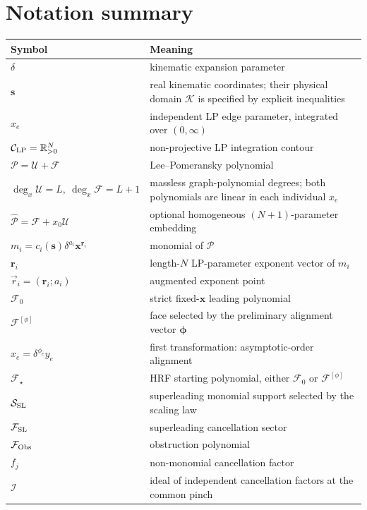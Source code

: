 \documentclass[a4paper,11pt]{article}
\newcommand{\x}{\boldsymbol{x}}
\newcommand{\s}{\boldsymbol{s}}
\newcommand{\K}{\mathcal K}
\newcommand{\FSL}{\mathcal F_{\rm SL}}
\newcommand{\SSL}{\mathcal S_{\rm SL}}
\newcommand{\FObs}{\mathcal F_{\rm Obs}}
\newcommand{\ideal}{\mathcal I}
\begin{document}
\appendix
\section{Notation summary}

\begin{center}
\begin{tabular}{@{}p{}p{}@{}}
\toprule
Symbol & Meaning\\
\midrule
\(\delta\) & kinematic expansion parameter\\
\(\s\) & real kinematic coordinates; their physical domain \(\K\) is specified
  by explicit inequalities\\
\(x_e\) & independent LP edge parameter, integrated over \((0,\infty)\)\\
\(\mathcal C_{\rm LP}=\mathbb R_{>0}^{N}\) & non-projective LP integration
  contour\\
\(\mathcal P=\mathcal U+\mathcal F\) & Lee--Pomeransky polynomial\\
\(\deg_x\mathcal U=L,\ \deg_x\mathcal F=L+1\) & massless graph-polynomial
  degrees; both polynomials are linear in each individual \(x_e\)\\
\(\widehat{\mathcal P}=\mathcal F+x_0\mathcal U\) & optional homogeneous
  \((N+1)\)-parameter embedding\\
\(m_i=c_i(\s)\delta^{a_i}\x^{\boldsymbol r_i}\) & monomial of
  \(\mathcal P\)\\
\(\boldsymbol r_i\) & length-\(N\) LP-parameter exponent vector of \(m_i\)\\
\(\vec r_i=(\boldsymbol r_i;a_i)\) & augmented exponent point\\
\(\mathcal F_0\) & strict fixed-\(\x\) leading polynomial\\
\(\mathcal F^{[\phi]}\) & face selected by the preliminary alignment vector
  \(\boldsymbol\phi\)\\
\(x_e=\delta^{\phi_e}y_e\) & first transformation: asymptotic-order
  alignment\\
\(\mathcal F_\star\) & HRF starting polynomial, either
  \(\mathcal F_0\) or \(\mathcal F^{[\phi]}\)\\
\(\SSL\) & superleading monomial support selected by the scaling law\\
\(\FSL\) & superleading cancellation sector\\
\(\FObs\) & obstruction polynomial\\
\(f_j\) & non-monomial cancellation factor\\
\(\ideal\) & ideal of independent cancellation factors at the common pinch\\

\end{tabular}
\end{center}
\end{document}
